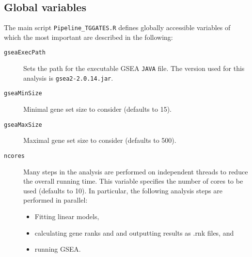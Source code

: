 \documentclass[a4paper,10pt]{scrartcl}
\begin{document}
\subsection{Global variables}

The main script \verb+Pipeline_TGGATES.R+ defines globally accessible variables of which the most important are described in the following:

\begin{description}
 \item[\texttt{gseaExecPath}] Sets the path for the executable GSEA \verb+JAVA+ file. The version used for this analysis is \verb+gsea2-2.0.14.jar+.
 \item[\texttt{gseaMinSize}] Minimal gene set size to consider (defaults to 15).
 \item[\texttt{gseaMaxSize}] Maximal gene set size to consider (defaults to 500).
 \item[\texttt{ncores}] Many steps in the analysis are performed on independent threads to reduce the overall running time. This variable specifies the number of cores to be used (defaults to 10). In particular, the following analysis steps are performed in parallel:
  \begin{itemize}
   \item Fitting linear models,
   \item calculating gene ranks and and outputting results as .rnk files, and
   \item running GSEA.
  \end{itemize}
\end{description}

% 



\newpage



\end{document}
